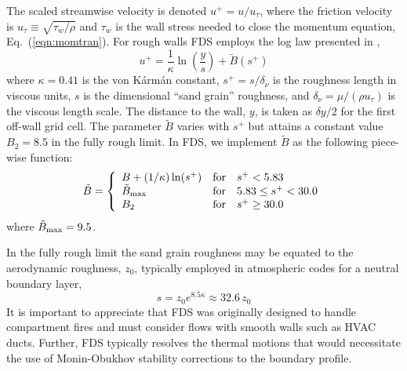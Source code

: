 \documentclass[journal,article,atmosphere,submit,moreauthors,pdftex]{Definitions/mdpi}
\begin{document}
The scaled streamwise velocity is denoted $u^+ = u/u_\tau$, where the friction velocity is $u_\tau \equiv \sqrt{\tau_w/\rho}$ and $\tau_w$ is the wall stress needed to close the momentum equation, Eq.~(\ref{eqn:momtran}).  For rough walls FDS employs the log law presented in \cite{Pope:2000},
\begin{equation}
\label{eqn_roughwallloglaw}
u^+ = \frac{1}{\kappa} \ln \left(\frac{y}{s}\right) + \tilde{B}(s^+)
\end{equation}
where $\kappa = 0.41$ is the von K\'arm\'an constant, $s^+ = s/\delta_\nu$ is the roughness length in viscous units, $s$ is the dimensional ``sand grain'' roughness, and $\delta_\nu = \mu/(\rho u_\tau)$ is the viscous length scale. The distance to the wall, $y$, is taken as $\delta y/2$ for the first off-wall grid cell.  The parameter $\tilde{B}$ varies with $s^+$ but attains a constant value $B_2=8.5$ in the fully rough limit.  In FDS, we implement $\tilde{B}$ as the following piece-wise function:
\begin{equation}
\tilde{B} = \left\{ \begin{array}{lll} B + (1/\kappa)\ln(s^+) & \mbox{for} & s^+ < 5.83 \\
\tilde{B}_{\rm max} & \mbox{for} & 5.83 \le s^+ < 30.0 \\
B_2 & \mbox{for} & s^+ \ge 30.0 \end{array} \right.
\end{equation}
where $\tilde{B}_{\rm max} = 9.5$.

In the fully rough limit the sand grain roughness may be equated to the aerodynamic roughness, $z_0$, typically employed in atmospheric codes for a neutral boundary layer,
\begin{equation}
s = z_0 e^{8.5 \kappa} \approx 32.6 \, z_0
\end{equation}
It is important to appreciate that FDS was originally designed to handle compartment fires and must consider flows with smooth walls such as HVAC ducts.  Further, FDS typically resolves the thermal motions that would necessitate the use of Monin-Obukhov stability corrections to the boundary profile.
\end{document}
